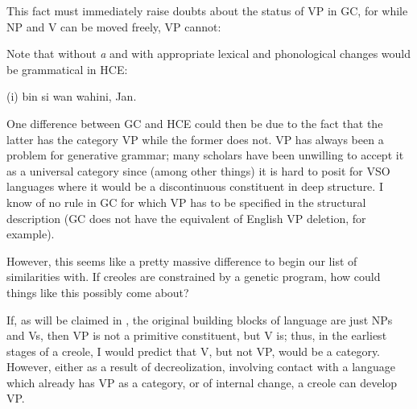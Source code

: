 This fact must immediately raise doubts about the status of
VP in GC, for while NP and V can be moved freely, VP cannot:

\label{ex:2:5}\z

\label{ex:2:6}\z

\label{ex:2:7}\z

\label{ex:2:8}\z
Note that  without \textit{a} and with appropriate lexical and phonological changes would be grammatical in HCE:

\ea\label{ex:2:9}
(i) bin si wan wahini, Jan.
\z

One difference between GC and HCE could then be due to the fact that the latter has the category VP while the former does not. VP has always been a problem for generative grammar; many scholars have been unwilling to accept it as a universal category since (among other things) it is hard to posit for VSO languages where it would be a discontinuous constituent in deep structure. I know of no rule in GC for which VP has to be specified in the structural description (GC does not have the equivalent of English VP deletion, for example).

However, this seems like a pretty massive difference to begin our list of similarities with. If creoles are constrained by a genetic program, how could things like this possibly come about?

If, as will be claimed in , the original building blocks of language are just NPs and Vs, then VP is not a primitive constituent, but V is; thus, in the earliest stages of a creole, I would predict that V, but not VP, would be a category. However, either as a result of decreolization, involving contact with a language which already has VP as a category, or of internal change, a creole can develop VP.\\\\

